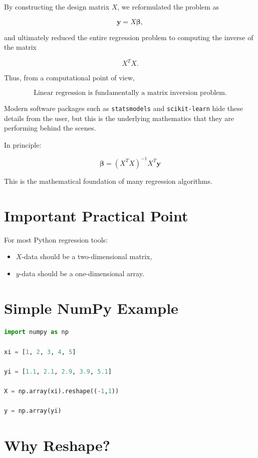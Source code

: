 \documentclass[11pt]{article}
\begin{document}
By constructing the design matrix $X$, we reformulated the problem as

\[
\mathbf{y}=X\boldsymbol{\beta},
\]

and ultimately reduced the entire regression problem to computing the inverse
of the matrix

\[
X^TX.
\]

Thus, from a computational point of view,

\[
\boxed{\text{Linear regression is fundamentally a matrix inversion problem.}}
\]

Modern software packages such as \lstinline|statsmodels| and
\lstinline|scikit-learn| hide these details from the user, but this is the
underlying mathematics that they are performing behind the scenes.

In principle:

\[
\mathbf{\beta}
=
(X^T X)^{-1} X^T \mathbf{y}
\]

This is the mathematical foundation of many regression algorithms.

\section{Important Practical Point}

For most Python regression tools:

\begin{itemize}
    \item \(X\)-data should be a two-dimensional matrix,
    \item \(y\)-data should be a one-dimensional array.
\end{itemize}

\section{Simple NumPy Example}

\begin{lstlisting}[language=Python]
import numpy as np

xi = [1, 2, 3, 4, 5]

yi = [1.1, 2.1, 2.9, 3.9, 5.1]

X = np.array(xi).reshape((-1,1))

y = np.array(yi)
\end{lstlisting}

\section{Why Reshape?}
\end{document}
